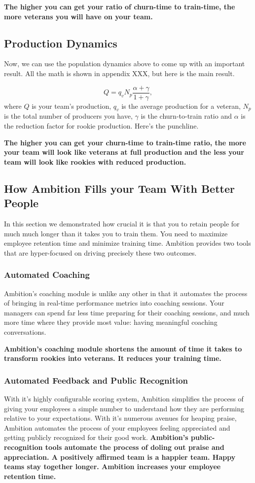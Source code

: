 \documentclass[paper=a4, fontsize=11pt abstract]{scrartcl}
\numberwithin{equation}{section}		%
\numberwithin{figure}{section}			%
\numberwithin{table}{section}				%
\begin{document}
\textbf{The higher you can get your ratio of churn-time to train-time, the more veterans you will have on your team.}

\subsection{Production Dynamics}
Now, we can use the population dynamics above to come up with an important result.  All the math is shown in appendix XXX, but here is the main result.

\begin{equation}
    Q = q_v N_p \frac{\alpha + \gamma}{1 + \gamma},
\end{equation}
where $Q$ is your team's production, $q_v$ is the average production for a veteran, $N_p$ is the total number of producers you have, $\gamma$ is the churn-to-train ratio and $\alpha$ is the reduction factor for rookie production.  Here's the punchline.

\textbf{The higher you can get your churn-time to train-time ratio, the more your team will look like veterans at full production and the less your team will look like rookies with reduced production.}

\subsection{How Ambition Fills your Team With Better People}
In this section we demonstrated how crucial it is that you to retain people for much much longer than it takes you to train them.  You need to maximize employee retention time and minimize training time.  Ambition provides two tools that are hyper-focused on driving precisely these two outcomes.
\subsubsection{Automated Coaching}
Ambition's coaching module is unlike any other in that it automates the process of bringing in real-time performance metrics into coaching sessions.  Your managers can spend far less time preparing for their coaching sessions, and much more time where they provide most value: having meaningful coaching conversations. 

\textbf{Ambition's coaching module shortens the amount of time it takes to transform rookies into veterans. It reduces your training time.}

\subsubsection{Automated Feedback and Public Recognition}
With it's highly configurable scoring system, Ambition simplifies the process of giving your employees a simple number to understand how they are performing relative to your expectations.  With it's numerous avenues for heaping praise, Ambition automates the process of your employees feeling appreciated and getting publicly recognized for their good work.
\textbf{Ambition's public-recognition tools automate the process of doling out praise and appreciation.  A positively affirmed team is a happier team.  Happy teams stay together longer.  Ambition increases your employee retention time.}
\end{document}
